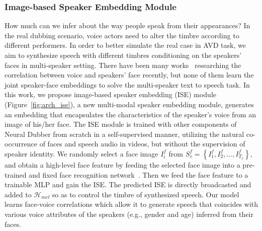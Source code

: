 \documentclass{article}
\begin{document}
\subsubsection{Image-based Speaker Embedding Module}
\label{sec:ise}
How much can we infer about the way people speak from their appearances?
In the real dubbing scenario, voice actors need to alter the timbre according to different performers.
In order to better simulate the real case in AVD task, we aim to synthesize speech with different timbres conditioning on the speakers' faces in multi-speaker setting. 
There have been many works~\cite{nagrani2018learnable,kim2018learning,chung2020seeing} researching the correlation between voice and speakers' face recently, but none of them learn the joint speaker-face embeddings to solve the multi-speaker text to speech task.
In this work, we propose image-based speaker embedding (ISE) module (Figure~\ref{fig:arch_ise}), a new multi-modal speaker embedding module, generates an embedding that encapsulates the characteristics of the speaker's voice from an image of his/her face. 
The ISE module is trained with other components of Neural Dubber from scratch in a self-supervised manner, utilizing the natural co-occurrence of faces and speech audio in videos, but without the supervision of speaker identity.
We randomly select a face image $I_i^f$ from $S_v^f=\left\{I_{1}^{f}, I_{2}^{f}, \ldots, I_{T_v}^{f}\right\}$, and obtain a high-level face feature by feeding the selected face image into a pre-trained and fixed face recognition network~\cite{parkhi2015deep,cao2018vggface2}. Then we feed the face feature to a trainable MLP and gain the ISE. The predicted ISE is directly broadcasted and added to $\mathcal{H}_{m e l} $ so as to control the timbre of synthesized speech.
Our model learns face-voice correlations which allow it to generate speech that coincides with various voice attributes of the speakers (e.g., gender and age) inferred from their faces.
\end{document}
